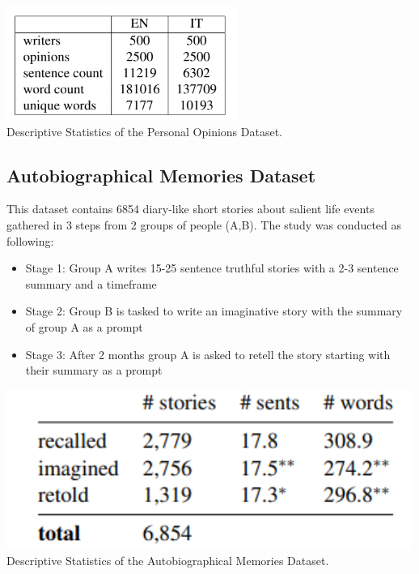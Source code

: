 \documentclass[10pt,twocolumn,letterpaper]{article}
\begin{document}
\begin{center}
\includegraphics[scale=1]{img/dec_op_dataset_statistics.png} \\
\small {Descriptive Statistics of the Personal Opinions Dataset.} 
\end{center}

\subsection{Autobiographical Memories Dataset}

This dataset contains 6854 diary-like short stories about salient life events gathered in 3 steps from 2 groups of people (A,B).
The study \cite{Sap} was conducted as following:

\begin{itemize}
    \item Stage 1: Group A writes 15-25 sentence truthful stories with a 2-3 sentence summary and a timeframe
    \item Stage 2: Group B is tasked to write an imaginative story with the summary of group A as a prompt
    \item Stage 3: After 2 months group A is asked to retell the story starting with their summary as a prompt
\end{itemize}

\begin{center}
\includegraphics[scale=0.35]{img/autobio_mem_dataset.jpg} \\
\small {Descriptive Statistics of the Autobiographical Memories Dataset.}
\end{center}
\end{document}
